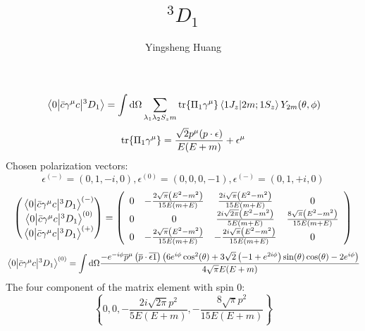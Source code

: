 \documentclass{article}
\title{$^3D_1$}
\author{Yingsheng Huang}
\newcommand{\gm}{\gamma^{\mu}}
\newcommand{\la}{\lambda}
\begin{document}
\maketitle
$$\mel{0}{\bar c\gm c}{^3D_1}=\int\dd\Omega\sum_{\la_1\la_2 S_zm}\tr{\Pi_1\gm}\braket{1J_z}{2m;1S_z}Y_{2m}(\theta,\phi)$$
$$\tr{\Pi_1\gm}=\frac{\sqrt{2}p^{\mu}(p\cdot\epsilon)}{E(E+m)}+\epsilon^{\mu}$$
Chosen polarization vectors: 
$$\epsilon^{(-)}=(0,1,-i,0),\epsilon^{(0)}=(0,0,0,-1),\epsilon^{(-)}=(0,1,+i,0)$$
$$\pmqty{\mel{0}{\bar c\gm c}{^3D_1}^{(-)}\\\mel{0}{\bar c\gm c}{^3D_1}^{(0)}\\\mel{0}{\bar c\gm c}{^3D_1}^{(+)}}=\left(
\begin{array}{cccc}
 0 & -\frac{2 \sqrt{\pi } \left(E^2-m^2\right)}{15 E (m+E)} & \frac{2 i \sqrt{\pi } \left(E^2-m^2\right)}{15 E (m+E)} & 0 \\
 0 & 0 & \frac{2 i \sqrt{2 \pi } \left(E^2-m^2\right)}{5 E (m+E)} & \frac{8 \sqrt{\pi } \left(E^2-m^2\right)}{15 E (m+E)} \\
 0 & -\frac{2 \sqrt{\pi } \left(E^2-m^2\right)}{15 E (m+E)} & -\frac{2 i \sqrt{\pi } \left(E^2-m^2\right)}{15 E (m+E)} & 0 \\
\end{array}
\right)$$
$$\mel{0}{\bar c\gm c}{^3D_1}^{(0)}=\int\dd\Omega \frac{-e^{-i \phi } \overline{p}^{\mu } \left(\overline{p}\cdot
   \overline{\text{$\epsilon $1}}\right) \left(6 e^{i \phi } \cos ^2(\theta )+3
   \sqrt{2} \left(-1+e^{2 i \phi }\right) \sin (\theta ) \cos (\theta )-2 e^{i \phi
   }\right)}{4 \sqrt{\pi } E (E+m)}$$
The four component of the matrix element with spin 0:
   $$\left\{0,0,-\frac{2 i \sqrt{2 \pi } p^2}{5 E (E+m)},-\frac{8 \sqrt{\pi } p^2}{15 E (E+m)}\right\}$$
\end{document}
